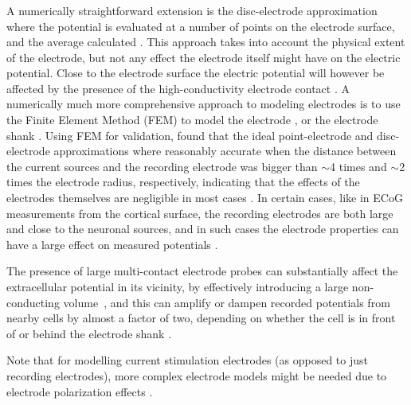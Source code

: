 \subsubsection{}
A numerically straightforward extension is the disc-electrode approximation where the potential is evaluated at a number of points on the electrode surface, and the average calculated \citep{ Linden2014}. This approach takes into account the physical extent of the electrode, but not any effect the electrode itself might have on the electric potential. Close to the electrode surface the electric potential will however be affected by the presence of the high-conductivity electrode contact \citep{McIntyre2001, Moulin2008}. A numerically much more comprehensive approach to modeling electrodes is to use the Finite Element Method (FEM) to model the electrode \citep{Moulin2008, Ness2015}, or the electrode shank \citep{Moffitt2005, Buccino2019b}. Using FEM for validation, \citep{Ness2015} found that the ideal point-electrode and disc-electrode approximations where reasonably accurate when the distance between the current sources and the recording electrode was bigger than $\sim$4 times and $\sim$2 times the electrode radius, respectively, indicating that the effects of the electrodes themselves are negligible in most cases \citep{Nelson2010}. In certain cases, like in ECoG measurements from the cortical surface, the recording electrodes are both large and close to the neuronal sources, and in such cases the electrode properties can have a large effect on measured potentials \citep{Vermaas2020, Rogers2020}.

The presence of large multi-contact electrode probes can substantially affect the extracellular potential in its vicinity, by effectively introducing a large non-conducting volume~\citep{Mechler2012}, and this can amplify or dampen recorded potentials from nearby cells by almost a factor of two, depending on whether the cell is in front of or behind the electrode shank \citep{Buccino2019b}.

Note that for modelling current stimulation electrodes (as opposed to just recording electrodes), more complex electrode models might be needed due to electrode polarization effects \citep{McIntyre2001, Martinsen2008, Joucla2012}.



